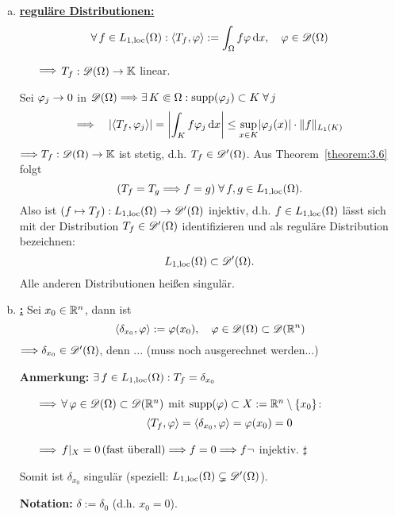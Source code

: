 \begin{bsp}
  \begin{enumerate}[(a)]
  \item \textbf{\underline{reguläre Distributionen:}}  
    \[
    \forall \,f\in L_{1,\scriptsize{\textnormal{loc}}}(\Omega):\langle T_f,\varphi\rangle:=\int_\Omega f\varphi\,\mathrm{d} x
   , \quad\varphi\in\mathscr{D}(\Omega)\]
    \begin{itemize}
    \item[$\Longrightarrow$] $T_f:\mathscr{D}(\Omega)\rightarrow\mathbb{K}$ linear.
    \end{itemize}
    Sei $\varphi_j\rightarrow0$ in $\mathscr{D}(\Omega)\Longrightarrow\exists \,K\Subset\Omega:\operatorname{supp}(\varphi_j)\subset K\;\forall \, j$
    \[
      \Longrightarrow\quad\lvert \langle T_f,\varphi_j\rangle\rvert=\left\lvert \int_K f\varphi_j\,\mathrm{d} x\right\rvert
      \leq\sup_{x\in K}\lvert \varphi_j(x)\rvert\cdot\lVert f\rVert_{L_1(K)}
    \]
    $\Longrightarrow T_f:\mathscr{D}(\Omega)\rightarrow\mathbb{K}$ ist stetig, d.h. $T_f\in\mathscr{D}'(\Omega)$. Aus Theorem~\ref{theorem:3.6} folgt $$
    	(T_f=T_g\Longrightarrow f=g)\;\forall\, f,g\in L_{1,\scriptsize{\textnormal{loc}}}(\Omega).
$$ 
Also ist $(f\mapsto T_f):L_{1,\scriptsize{\textnormal{loc}}}(\Omega)\rightarrow\mathscr{D}'(\Omega)$
injektiv, d.h. $f\in L_{1,\scriptsize{\textnormal{loc}}}(\Omega)$ lässt sich mit der Distribution $T_f\in\mathscr{D}'(\Omega)$ identifizieren und als reguläre Distribution bezeichnen:
    \[ L_{1,\scriptsize{\textnormal{loc}}}(\Omega)\subset\mathscr{D}'(\Omega). \]
    Alle anderen Distributionen heißen singulär. 
  \item \textbf{\underline{:}} Sei $x_0\in\mathbb{R}^n$, dann ist
    \[ \langle\delta_{x_0},\varphi\rangle:=\varphi(x_0), \quad\varphi\in\mathscr{D}(\Omega)\subset\mathscr{D}(\mathbb{R}^n) \]
    $\Longrightarrow\delta_{x_0}\in\mathscr{D}'(\Omega)$, denn ... (muss noch ausgerechnet werden...)

    \textbf{Anmerkung:} $\exists \, f\in L_{1,\scriptsize{\textnormal{loc}}}(\Omega): T_f=\delta_{x_0}$
    \begin{itemize}
    \item[$\Longrightarrow$] $\forall\,  \varphi\in\mathscr{D}(\Omega)\subset\mathscr{D}(\mathbb{R}^n)$ mit $\operatorname{supp}(\varphi)\subset X:=\mathbb{R}^n\setminus\{x_0\}$:
      \[ \langle T_f,\varphi\rangle=\langle\delta_{x_0},\varphi\rangle=\varphi(x_0)=0 \]
    \item[$\Longrightarrow$] $f\vert_X=0\, (\text{fast überall})\Longrightarrow f=0 \Longrightarrow f \neg$ injektiv. \hspace*{\fill}$\sharp$
    \end{itemize}
    Somit ist $\delta_{x_0}$ singulär (speziell: $L_{1,\scriptsize{\textnormal{loc}}}(\Omega)\subsetneq\mathscr{D}'(\Omega)$).

    \textbf{Notation:} $\delta:=\delta_0$ (d.h. $x_0=0$).


\end{enumerate}
\end{bsp}
